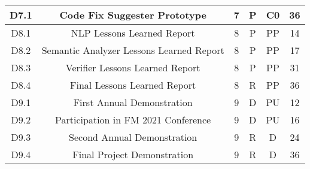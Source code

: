 \begin{center}
\begin{adjustbox}{width=1\textwidth}
\begin{tabular}{ |c|c|c|c|c|c|}
			D7.1 & Code Fix Suggester Prototype & 7 & P & C0 & 36\\
			\hline
			
			D8.1 & NLP Lessons Learned Report & 8 & P & PP & 14\\
			\hline
			
			D8.2 & Semantic Analyzer Lessons Learned Report & 8 & P & PP & 17\\
			\hline
			
			D8.3 & Verifier Lessons Learned Report & 8 & P & PP & 31\\
			\hline
			
			D8.4 & Final Lessons Learned Report & 8 & R & PP & 36\\
			\hline
			
			D9.1 & First Annual Demonstration & 9 & D & PU & 12\\
			\hline
			
			D9.2 & Participation in FM 2021 Conference & 9 & D & PU & 16\\
			\hline
			
			D9.3 & Second Annual Demonstration & 9 & R & D & 24\\
			\hline
			
			D9.4 & Final Project Demonstration & 9 & R & D & 36\\
			\hline
			
		\end{tabular}
	\end{adjustbox}
\end{center}